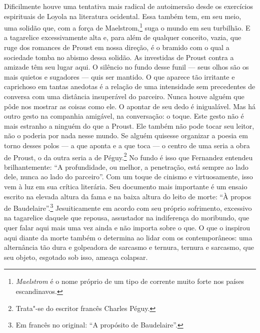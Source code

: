 Dificilmente houve uma tentativa mais radical de autoimersão desde os
exercícios espirituais de Loyola na literatura ocidental. Essa também
tem, em seu meio, uma solidão que, com a força de Maelstrom,\footnote{\emph{Maelstrom} é o nome próprio de um tipo de corrente muito forte
  nos países escandinavos. \versal{[N.~T.]}} suga o mundo em seu turbilhão. E a
tagarelice excessivamente alta e, para além de qualquer conceito, vazia,
que ruge dos romances de Proust em nossa direção, é o bramido com o qual
a sociedade tomba no abismo dessa solidão. As investidas de Proust
contra a amizade têm seu lugar aqui. O silêncio no fundo desse funil ---
seus olhos são os mais quietos e sugadores --- quis ser mantido. O que
aparece tão irritante e caprichoso em tantas anedotas é a relação de uma
intensidade sem precedentes de conversa com uma distância insuperável do
parceiro. Nunca houve alguém que pôde nos mostrar as coisas como ele. O
apontar de seu dedo é inigualável. Mas há outro gesto na companhia
amigável, na conversação: o toque. Este gesto não é mais estranho a
ninguém do que a Proust. Ele também não pode tocar seu leitor, não o
poderia por nada nesse mundo. Se alguém quisesse organizar a poesia em
torno desses polos --- a que aponta e a que toca --- o centro de uma seria
a obra de Proust, o da outra seria a de Péguy.\footnote{Trata"-se do
  escritor francês Charles Péguy. \versal{[N.~O.]}} No fundo é isso que Fernandez
entendeu brilhantemente: ``A profundidade, ou melhor, a penetração, está
sempre ao lado dele, nunca ao lado do parceiro''. Com um toque de
cinismo e virtuosamente, isso vem à luz em sua crítica literária. Seu
documento mais importante é um ensaio escrito na elevada altura da fama e
na baixa altura do leito de morte: ``À propos de Baudelaire''.\footnote{Em francês no  original: ``A propósito de Baudelaire''. \versal{[N.~T.]}} Jesuiticamente em acordo com seu próprio
sofrimento, excessivo na tagarelice daquele que repousa, assustador na
indiferença do moribundo, que quer falar aqui mais uma vez ainda e não
importa sobre o que. O que o inspirou aqui diante da morte também o
determina ao lidar com os contemporâneos: uma alternância tão dura e
golpeadora de sarcasmo e ternura, ternura e sarcasmo, que seu objeto,
esgotado sob isso, ameaça colapsar.

